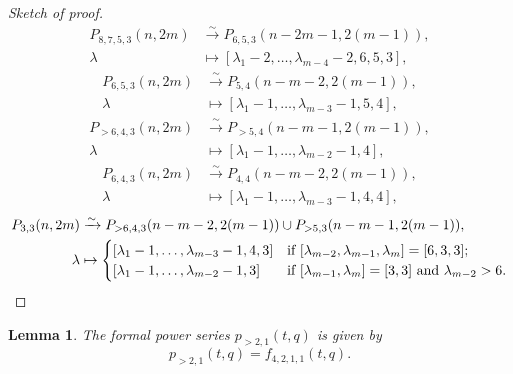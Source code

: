 \documentclass[a4paper, 12pt, reqno]{amsart}
\newtheorem{lemma}[theorem]{Lemma}
\theoremstyle{remark}
\begin{document}
\begin{proof}[Sketch of proof]
\begin{align*}
    P_{8, 7, 5, 3}(n, 2m) &\xrightarrow{\sim} P_{6, 5, 3}(n - 2m - 1, 2(m - 1)), \\
    \lambda &\mapsto [\lambda_1 - 2, \dots, \lambda_{m - 4} - 2, 6, 5, 3],
  \end{align*}
  \begin{align*}
    P_{6, 5, 3}(n, 2m) &\xrightarrow{\sim} P_{5, 4}(n - m - 2, 2(m - 1)), \\
    \lambda &\mapsto [\lambda_1 - 1, \dots, \lambda_{m - 3} - 1, 5, 4],
  \end{align*}
  \begin{align*}
    P_{>6, 4, 3}(n, 2m) &\xrightarrow{\sim} P_{>5, 4}(n - m - 1, 2(m - 1)), \\
    \lambda &\mapsto [\lambda_1 - 1, \dots, \lambda_{m - 2} - 1, 4],
  \end{align*}
  \begin{align*}
    P_{6, 4, 3}(n, 2m) &\xrightarrow{\sim} P_{4, 4}(n - m - 2, 2(m - 1)), \\
    \lambda &\mapsto [\lambda_1 - 1, \dots, \lambda_{m - 3} - 1, 4, 4],
  \end{align*}
  \begin{align*}
    P_{3, 3}(n, 2m) &\xrightarrow{\sim} P_{>6, 4, 3}(n - m - 2, 2(m - 1)) \cup P_{>5, 3}(n - m - 1, 2(m - 1)), \\
    \lambda &\mapsto
              \begin{cases}
                [\lambda_1 - 1, \dots, \lambda_{m - 3} - 1, 4, 3] &\text{if $[\lambda_{m - 2}, \lambda_{m - 1}, \lambda_m] = [6, 3, 3]$}; \\
                [\lambda_1 - 1, \dots, \lambda_{m - 2} - 1, 3] &\text{if $[\lambda_{m - 1}, \lambda_m] = [3, 3]$ and $\lambda_{m - 2} > 6$}. \qedhere
              \end{cases}
  \end{align*}
\end{proof}

\begin{lemma}
  \label{lmm:41}
  The formal power series $p_{>2, 1}(t, q)$ is given by
  \begin{equation*}
    p_{>2, 1}(t, q) = f_{4, 2, 1, 1}(t, q).
  \end{equation*}
\end{lemma}
\end{document}
